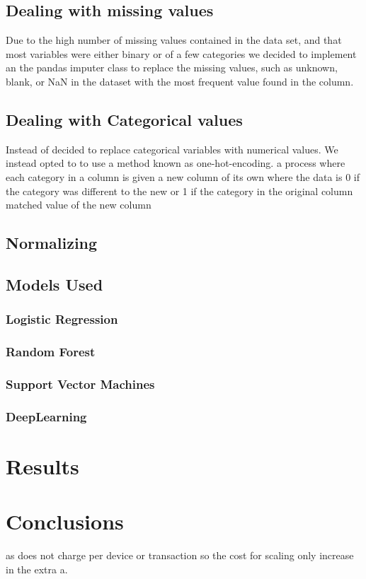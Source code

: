 \documentclass[sigconf]{acmart}
\begin{document}
\subsection{Dealing with missing values}
Due to the high number of missing values contained in the data set, and that most variables were either binary or of a few categories we decided to implement an the pandas imputer class to replace the missing values, such as unknown, blank, or NaN in the dataset with the most frequent value found in the column.
\subsection{Dealing with Categorical values}
Instead of decided to replace categorical variables with numerical values. We instead opted to to use a method known as one-hot-encoding. a process where each category in a column is given a new column of its own where the data is 0 if the category was different to the new or 1 if the category in the original column matched value of the new column 
\subsection{Normalizing}

\subsection{Models Used}
\subsubsection{Logistic Regression}
\subsubsection{Random Forest}
\subsubsection{Support Vector Machines}
\subsubsection{DeepLearning}

\section{Results}

\section{Conclusions}
as does not charge per device or transaction so the cost for scaling only increase in the extra a.
\end{document}
